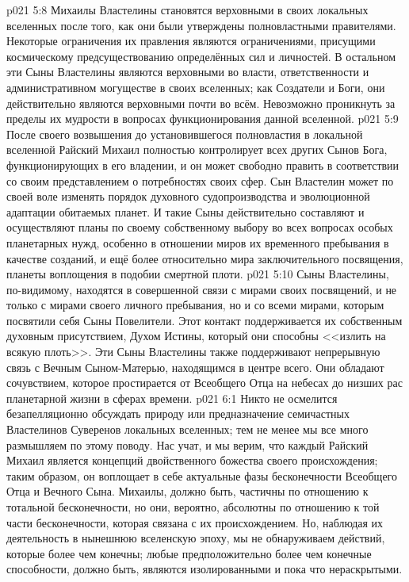 \vs p021 5:8 \pc Михаилы Властелины становятся верховными в своих локальных вселенных после того, как они были утверждены полновластными правителями. Некоторые ограничения их правления являются ограничениями, присущими космическому предсуществованию определённых сил и личностей. В остальном эти Сыны Властелины являются верховными во власти, ответственности и административном могуществе в своих вселенных; как Создатели и Боги, они действительно являются верховными почти во всём. Невозможно проникнуть за пределы их мудрости в вопросах функционирования данной вселенной.
\vs p021 5:9 После своего возвышения до установившегося полновластия в локальной вселенной Райский Михаил полностью контролирует всех других Сынов Бога, функционирующих в его владении, и он может свободно править в соответствии со своим представлением о потребностях своих сфер. Сын Властелин может по своей воле изменять порядок духовного судопроизводства и эволюционной адаптации обитаемых планет. И такие Сыны действительно составляют и осуществляют планы по своему собственному выбору во всех вопросах особых планетарных нужд, особенно в отношении миров их временного пребывания в качестве созданий, и ещё более относительно мира заключительного посвящения, планеты воплощения в подобии смертной плоти.
\vs p021 5:10 Сыны Властелины, по\hyp{}видимому, находятся в совершенной связи с мирами своих посвящений, и не только с мирами своего личного пребывания, но и со всеми мирами, которым посвятили себя Сыны Повелители. Этот контакт поддерживается их собственным духовным присутствием, Духом Истины, который они способны <<излить на всякую плоть>>. Эти Сыны Властелины также поддерживают непрерывную связь с Вечным Сыном\hyp{}Матерью, находящимся в центре всего. Они обладают сочувствием, которое простирается от Всеобщего Отца на небесах до низших рас планетарной жизни в сферах времени.
\vs p021 6:1 Никто не осмелится безапелляционно обсуждать природу или предназначение семичастных Властелинов Суверенов локальных вселенных; тем не менее мы все много размышляем по этому поводу. Нас учат, и мы верим, что каждый Райский Михаил является  концепций двойственного божества своего происхождения; таким образом, он воплощает в себе актуальные фазы бесконечности Всеобщего Отца и Вечного Сына. Михаилы, должно быть, частичны по отношению к тотальной бесконечности, но они, вероятно, абсолютны по отношению к той части бесконечности, которая связана с их происхождением. Но, наблюдая их деятельность в нынешнюю вселенскую эпоху, мы не обнаруживаем действий, которые более чем конечны; любые предположительно более чем конечные способности, должно быть, являются изолированными и пока что нераскрытыми.
